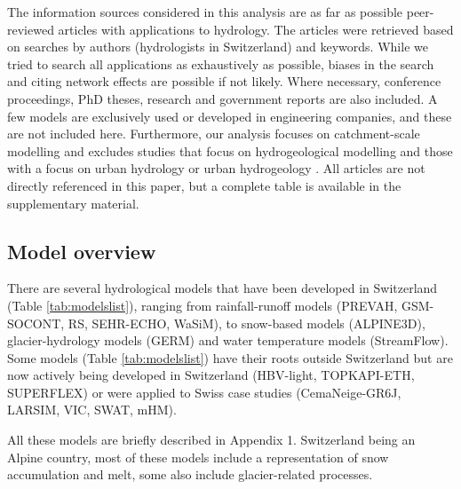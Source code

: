 \documentclass[10pt,a4paper]{article}
\begin{document}
The information sources considered in this analysis are as far as possible peer-reviewed articles with applications to hydrology. The articles were retrieved based on searches by authors (hydrologists in Switzerland) and keywords. While we tried to search all applications as exhaustively as possible, biases in the search and citing network effects are possible if not likely. Where necessary, conference proceedings, PhD theses, research and government reports are also included. A few models are exclusively used or developed in engineering companies, and these are not included here. Furthermore, our analysis focuses on catchment-scale modelling and excludes studies that focus on hydrogeological modelling \citep{Carlier2019} and those with a focus on urban hydrology \citep{Peleg2017} or urban hydrogeology \citep{schirmer2013}. All articles are not directly referenced in this paper, but a complete table is available in the supplementary material.

\subsection{Model overview}
\label{sec:models:overview}

There are several hydrological models that have been developed in Switzerland (Table \ref{tab:modelslist}), ranging from rainfall-runoff models (PREVAH, GSM-SOCONT, RS, SEHR-ECHO, WaSiM), to snow-based models (ALPINE3D), glacier-hydrology models (GERM) and water temperature models (StreamFlow). Some models (Table \ref{tab:modelslist}) have their roots outside Switzerland but are now actively being developed in Switzerland (HBV-light, TOPKAPI-ETH, SUPERFLEX) or were applied to Swiss case studies (CemaNeige-GR6J, LARSIM, VIC, SWAT, mHM). 

All these models are briefly described in Appendix 1. Switzerland being an Alpine country, most of these models include a representation of snow accumulation and melt, some also include glacier-related processes.
\end{document}
